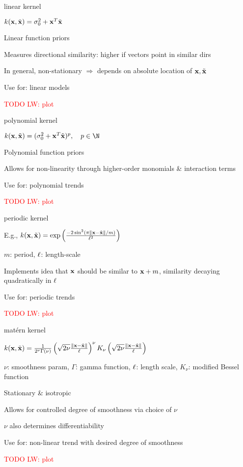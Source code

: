 \documentclass[11pt,compress,t,notes=noshow, xcolor=table]{beamer}
\begin{document}
\begin{framei}{linear kernel}
\item $k(\mathbf{x}, \tilde{\mathbf{x}}) = \sigma^2_0 + \mathbf{x}^T \tilde{\mathbf{x}}$
\item Linear function priors
\item Measures directional similarity: higher if vectors point in similar dirs
\item In general, non-stationary $\Rightarrow$ depends on absolute location of $\mathbf{x}, \tilde{\mathbf{x}}$
\item Use for: linear models
\item \textcolor{red}{TODO LW: plot}
\end{framei}

\begin{framei}{polynomial kernel}
\item $k(\xv, \tilde{\xv}) = (\sigma^2_0 + \xv^T \tilde{\xv} )^p, \quad p \in \N$
\item Polynomial function priors
\item Allows for non-linearity through higher-order monomials \& interaction terms
\item Use for: polynomial trends
\item \textcolor{red}{TODO LW: plot}
\end{framei}

\begin{framei}{periodic kernel}
\item E.g., $k(\mathbf{x}, \tilde{\mathbf{x}}) = \exp \left(\frac{-2\sin^2 (\pi \| \mathbf{x} - \tilde{\mathbf{x}}\| / m)}{\ell^2} \right)$
\item $m$: period, $\ell$: length-scale
\item Implements idea that $\mathbf{x}$ should be similar to $\mathbf{x} + m$, similarity decaying quadratically in $\ell$
\item Use for: periodic trends
\item \textcolor{red}{TODO LW: plot}
\end{framei}

\begin{framei}{matérn kernel}
\item $k(\mathbf{x}, \tilde{\mathbf{x}}) = \frac{1}{2^\nu \Gamma(\nu)} \left( \sqrt{2 \nu} \frac{\| \mathbf{x} - \tilde{\mathbf{x}} \|}{\ell} \right)^\nu K_\nu \left( \sqrt{2 \nu} \frac{\| \mathbf{x} - \tilde{\mathbf{x}} \|}{\ell} \right)$
\item $\nu$: smoothness param, $\Gamma$: gamma function, $\ell$: length scale, $K_\nu$: modified Bessel function
\item Stationary \& isotropic
\item Allows for controlled degree of smoothness via choice of $\nu$
\item $\nu$ also determines differentiability
\item Use for: non-linear trend with desired degree of smoothness
\item \textcolor{red}{TODO LW: plot}
\end{framei}
\end{document}

